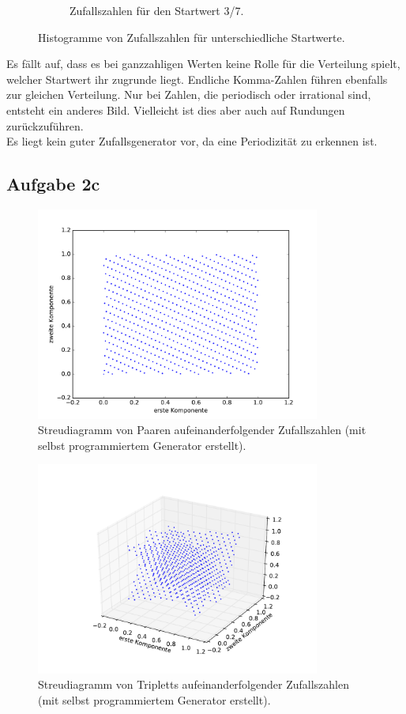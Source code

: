 \documentclass[
  bibliography=totoc,     %
  captions=tableheading,  %
  titlepage=firstiscover, %
]{scrartcl}
\begin{document}
\begin{figure}[H]
\begin{subfigure}{0.48\textwidth}
        \caption{Zufallszahlen für den Startwert 3/7.}
      \end{subfigure}
      \caption{Histogramme von Zufallszahlen für unterschiedliche Startwerte.}
      \label{fig:histogramme}
    \end{figure}


    Es fällt auf, dass es bei ganzzahligen Werten keine Rolle für die Verteilung
    spielt, welcher Startwert ihr zugrunde liegt. Endliche Komma-Zahlen
    führen ebenfalls zur gleichen Verteilung. Nur bei Zahlen, die periodisch
    oder irrational sind, entsteht ein anderes Bild. Vielleicht ist dies
    aber auch auf Rundungen zurückzuführen. \\
    Es liegt kein guter Zufallsgenerator vor, da eine Periodizität zu erkennen
    ist.


    \subsection{Aufgabe 2c}

    \begin{figure}[H]
      \centering
      \includegraphics[height=7cm]{2D.pdf}
      \caption{Streudiagramm von Paaren aufeinanderfolgender Zufallszahlen
      (mit selbst programmiertem Generator erstellt).}
      \label{fig:2dscatter}
    \end{figure}

    \begin{figure}[H]
      \centering
      \includegraphics[height=7cm]{3D.pdf}
      \caption{Streudiagramm von Tripletts aufeinanderfolgender Zufallszahlen
      (mit selbst programmiertem Generator erstellt).}
      \label{fig:3dscatter}
    \end{figure}
\end{document}
